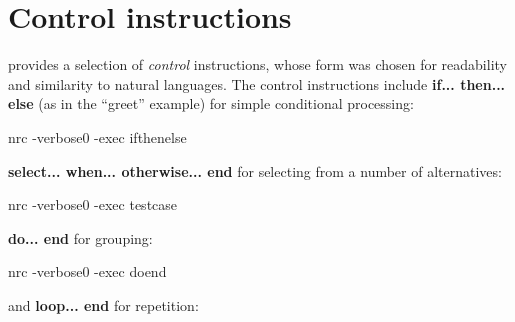 \section{Control instructions}
\nr{} provides a selection of \emph{control} instructions, whose form was
chosen for readability and similarity to natural languages. The
control instructions include \textbf{if... then... else} (as in the “greet”
example) for simple conditional processing:


\begin{shaded}
\bash[stdout]
nrc -verbose0 -exec ifthenelse
\END
\end{shaded}

\textbf{select... when... otherwise... end} for selecting from a number of
alternatives:


\begin{shaded}
\bash[stdout]
nrc -verbose0 -exec testcase
\END
\end{shaded}

\textbf{do... end} for grouping:


\begin{shaded}
\bash[stdout]
nrc -verbose0 -exec doend
\END
\end{shaded}

and \textbf{loop... end} for repetition:


